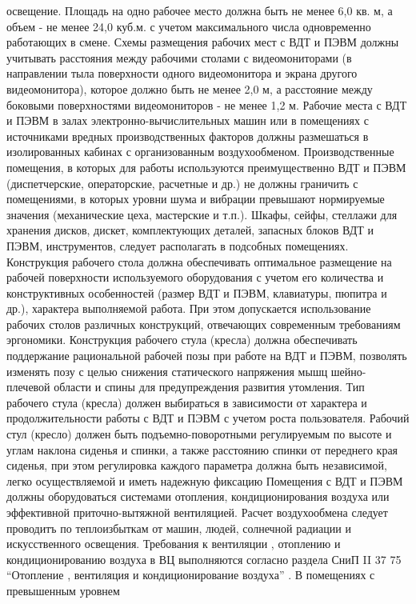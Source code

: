 освещение. Площадь на одно рабочее место должна быть не менее 6,0 кв. м, а объем - не менее 24,0 куб.м. с учетом
максимального числа одновременно работающих в смене. Схемы размещения рабочих мест с ВДТ и ПЭВМ должны учитывать
расстояния между рабочими столами с видеомониторами (в направлении тыла поверхности одного видеомонитора и экрана
другого видеомонитора), которое должно быть не менее 2,0 м, а расстояние между боковыми поверхностями
видеомониторов - не менее 1,2 м. Рабочие места с ВДТ и ПЭВМ в залах электронно-вычислительных машин или в помещениях
с источниками вредных производственных факторов должны размешаться в изолированных кабинах с организованным
воздухообменом. Производственные помещения, в которых для работы используются преимущественно ВДТ и ПЭВМ
(диспетчерские, операторские, расчетные и др.) не должны граничить с помещениями, в которых уровни шума и вибрации
превышают нормируемые значения (механические цеха, мастерские и т.п.). Шкафы, сейфы, стеллажи для хранения дисков,
дискет, комплектующих деталей, запасных блоков ВДТ и ПЭВМ, инструментов, следует располагать в подсобных помещениях.
Конструкция рабочего стола должна обеспечивать оптимальное размещение на рабочей поверхности используемого оборудования с
учетом его количества и конструктивных особенностей (размер ВДТ и ПЭВМ, клавиатуры, пюпитра и др.), характера выполняемой
работа. При этом допускается использование рабочих столов различных конструкций, отвечающих современным требованиям
эргономики. Конструкция рабочего стула (кресла) должна обеспечивать поддержание рациональной рабочей позы при работе на
ВДТ и ПЭВМ, позволять изменять позу с целью снижения статического напряжения мышц шейно-плечевой области и спины для
предупреждения развития утомления. Тип рабочего стула (кресла) должен выбираться в зависимости от характера и
продолжительности работы с ВДТ и ПЭВМ с учетом роста пользователя. Рабочий стул (кресло) должен быть
подъемно-поворотными регулируемым по высоте и углам наклона сиденья и спинки, а также расстоянию спинки от переднего
края сиденья, при этом регулировка каждого параметра должна быть независимой, легко осуществляемой и иметь надежную
фиксацию Помещения с ВДТ и ПЭВМ должны оборудоваться системами отопления, кондиционирования воздуха или эффективной
приточно-вытяжной вентиляцией. Расчет воздухообмена следует проводитъ по теплоизбыткам от машин, людей, солнечной
радиации и искусственного освещения. Требования к вентиляции , отоплению и кондиционированию воздуха в ВЦ выполняются
согласно раздела СниП II 37 75 “Отопление , вентиляция и кондиционирование воздуха” . В помещениях с превышенным уровнем
